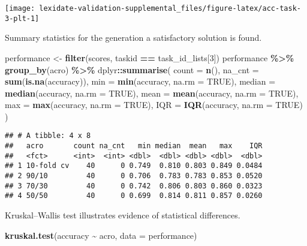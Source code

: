 \documentclass[
]{book}
\newenvironment{Shaded}{\begin{snugshade}}{\end{snugshade}}
\newcommand{\AttributeTok}[1]{\textcolor[rgb]{0.13,0.29,0.53}{#1}}
\newcommand{\ConstantTok}[1]{\textcolor[rgb]{0.56,0.35,0.01}{#1}}
\newcommand{\DecValTok}[1]{\textcolor[rgb]{0.00,0.00,0.81}{#1}}
\newcommand{\FunctionTok}[1]{\textcolor[rgb]{0.13,0.29,0.53}{\textbf{#1}}}
\newcommand{\NormalTok}[1]{#1}
\newcommand{\OtherTok}[1]{\textcolor[rgb]{0.56,0.35,0.01}{#1}}
\newcommand{\SpecialCharTok}[1]{\textcolor[rgb]{0.81,0.36,0.00}{\textbf{#1}}}
\begin{document}
\texttt{[image: lexidate-validation-supplemental\_files/figure-latex/acc-task-3-plt-1]}

Summary statistics for the generation a satisfactory solution is found.

\begin{Shaded}
\begin{Highlighting}[]
\NormalTok{performance }\OtherTok{\textless{}{-}} \FunctionTok{filter}\NormalTok{(scores, taskid }\SpecialCharTok{==}\NormalTok{ task\_id\_lists[}\DecValTok{3}\NormalTok{])}
\NormalTok{performance }\SpecialCharTok{\%\textgreater{}\%}
  \FunctionTok{group\_by}\NormalTok{(acro) }\SpecialCharTok{\%\textgreater{}\%}
\NormalTok{  dplyr}\SpecialCharTok{::}\FunctionTok{summarise}\NormalTok{(}
    \AttributeTok{count =} \FunctionTok{n}\NormalTok{(),}
    \AttributeTok{na\_cnt =} \FunctionTok{sum}\NormalTok{(}\FunctionTok{is.na}\NormalTok{(accuracy)),}
    \AttributeTok{min =} \FunctionTok{min}\NormalTok{(accuracy, }\AttributeTok{na.rm =} \ConstantTok{TRUE}\NormalTok{),}
    \AttributeTok{median =} \FunctionTok{median}\NormalTok{(accuracy, }\AttributeTok{na.rm =} \ConstantTok{TRUE}\NormalTok{),}
    \AttributeTok{mean =} \FunctionTok{mean}\NormalTok{(accuracy, }\AttributeTok{na.rm =} \ConstantTok{TRUE}\NormalTok{),}
    \AttributeTok{max =} \FunctionTok{max}\NormalTok{(accuracy, }\AttributeTok{na.rm =} \ConstantTok{TRUE}\NormalTok{),}
    \AttributeTok{IQR =} \FunctionTok{IQR}\NormalTok{(accuracy, }\AttributeTok{na.rm =} \ConstantTok{TRUE}\NormalTok{)}
\NormalTok{  )}
\end{Highlighting}
\end{Shaded}

\begin{verbatim}
## # A tibble: 4 x 8
##   acro       count na_cnt   min median  mean   max    IQR
##   <fct>      <int>  <int> <dbl>  <dbl> <dbl> <dbl>  <dbl>
## 1 10-fold cv    40      0 0.749  0.810 0.803 0.849 0.0484
## 2 90/10         40      0 0.706  0.783 0.783 0.853 0.0520
## 3 70/30         40      0 0.742  0.806 0.803 0.860 0.0323
## 4 50/50         40      0 0.699  0.814 0.811 0.857 0.0260
\end{verbatim}

Kruskal--Wallis test illustrates evidence of statistical differences.

\begin{Shaded}
\begin{Highlighting}[]
\FunctionTok{kruskal.test}\NormalTok{(accuracy }\SpecialCharTok{\textasciitilde{}}\NormalTok{ acro, }\AttributeTok{data =}\NormalTok{ performance)}
\end{Highlighting}
\end{Shaded}
\end{document}
